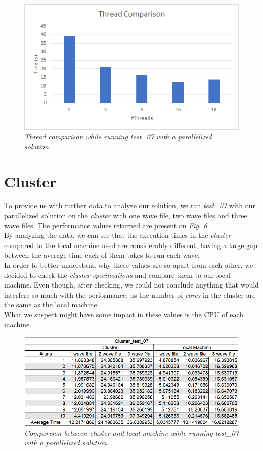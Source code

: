 \documentclass[10pt,journal,compsoc]{IEEEtran}
\begin{document}
\begin{figure}
    \centering
    \includegraphics[scale=0.5]{thread_comparison.png}
    \caption{\itshape{Thread comparison while running test\_07 with a parallelized solution.}}
    \label{fig:my_label}
\end{figure}

\section{Cluster}

To provide us with further data to analyze our solution, we ran {\itshape test\_07} with our parallelized solution on the {\itshape cluster} with one wave file, two wave files and three wave files. The performance values returned are present on {\itshape Fig. 6}.
\\By analyzing the data, we can see that the execution times in the {\itshape cluster} compared to the local machine used are considerably different, having a large gap between the average time each of them takes to run each wave.
\\In order to better understand why these values are so apart from each other, we decided to check the {\itshape cluster specifications} and compare them to our local machine. Even though, after checking, we could not conclude anything that would interfere so much with the performance, as the number of {\itshape cores} in the cluster are the same as the local machine.
\\What we suspect might have some impact in these values is the CPU of each machine.

\begin{figure}
    \centering
    \includegraphics[scale=0.30]{cluster_test_07.png}
    \caption{\itshape{Comparison between cluster and local machine while running test\_07 with a parallelized solution.}}
    \label{fig:my_label}
\end{figure}
\end{document}
